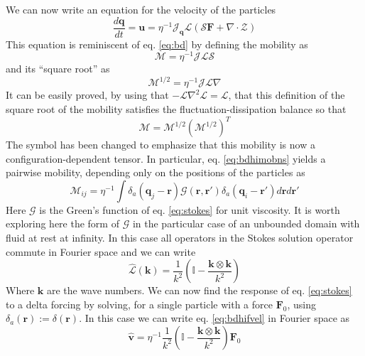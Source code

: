 \documentclass[ twoside,openright,titlepage,numbers=noenddot,%
headinclude,footinclude,cleardoublepage=empty,abstract=on,
BCOR=5mm,paper=a4,fontsize=11pt, dvipsnames
]{scrreprt}
\renewcommand{\vec}[1]{\bm{#1}}
\newcommand{\tens}[1]{\bm{\mathcal{#1}}}
\newcommand{\oper}[1]{\mathcal{#1}}
\newcommand{\fou}[1]{\widehat{#1}}
\newcommand{\ppos}{q}
\newcommand{\fvel}{v}
\begin{document}
We can now write an equation for the velocity of the particles
\begin{equation}
  \label{eq:bdhibdrelation}
  \frac{d\vec{q}}{dt} = \vec{u} = \eta^{-1}\oper{J}_{\vec{\ppos}}\oper{L}(\oper{S}\vec{F} + \nabla\cdot\mathcal Z)
\end{equation}
This equation is reminiscent of eq. \eqref{eq:bd} by defining the mobility as
\begin{equation}
  \label{eq:bdhimobns}
  \tens{M} = \eta^{-1}\oper{J}\oper{L}\oper{S}
\end{equation}
and its ``square root'' as
\begin{equation}
  \tens{M}^{1/2} = \eta^{-1}\oper{J}\oper{L}\nabla
\end{equation}
It can be easily proved, by using that $-\oper{L}\nabla^2\oper{L} = \oper{L}$\cite{Delong2014}, that this definition of the square root of the mobility satisfies the fluctuation-dissipation balance so that
\begin{equation}
  \label{eq:mobsqrt}
  \tens{M} = \tens{M}^{1/2}\left(\tens{M}^{1/2}\right)^T
\end{equation}
The symbol has been changed to emphasize that this mobility is now a configuration-dependent tensor. In particular, eq. \eqref{eq:bdhimobns} yields a pairwise mobility, depending only on the positions of the particles as
\begin{equation}
  \label{eq:bdhimob}
  \tens{M}_{ij} = \eta^{-1}\int{\delta_a(\vec{q}_j-\vec{r})\tens{G}(\vec{r}, \vec{r}')\delta_a(\vec{q}_i -\vec{r}')d\vec{r}d\vec{r}'}
\end{equation}
Here $\tens{G}$ is the Green's function of eq. \eqref{eq:stokes} for unit viscosity.
It is worth exploring here the form of $\tens{G}$ in the particular case of an unbounded domain with fluid at rest at infinity. 
In this case all operators in the Stokes solution operator commute in Fourier space and we can write 
\begin{equation}
  \label{eq:stokesoperfou}
  \fou{\oper{L}}(\vec{k}) = \frac{1}{k^2}\left(\mathbb{I} - \frac{\vec{k}\otimes\vec{k}}{k^2}\right)
\end{equation}
Where $\vec{k}$ are the wave numbers.
We can now find the response of eq. \eqref{eq:stokes} to a delta forcing by solving, for a single particle with a force $\vec{F}_0$, using $\delta_a(\vec{r}) := \delta(\vec{r})$.
In this case we can write eq. \eqref{eq:bdhifvel} in Fourier space as
\begin{equation}
  \label{eq:bdhifvelfou}
  \hat{\vec{\fvel}} = \eta^{-1}\frac{1}{k^2}\left(\mathbb{I} - \frac{\vec{k}\otimes\vec{k}}{k^2}\right)\vec{F}_0
\end{equation}
\end{document}
